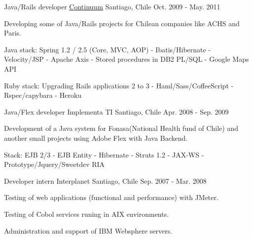 \begin{cventries}
  \cventry
    {Java/Rails developer} %
    {\href{http://www.continuumhq.co/}{\underline{Continuum}}} %
    {Santiago, Chile} %
    {Oct. 2009 - May. 2011} %
    {
      \begin{cvitems} %
        \item { Developing some of Java/Rails projects for Chilean companies like ACHS and Paris.}
        \item { Java stack: Spring 1.2 / 2.5 (Core, MVC, AOP) - Ibatis/Hibernate -
                Velocity/JSP - Apache Axis - Stored procedures in DB2 PL/SQL - Google Maps API}
        \item { Ruby stack: Upgrading Rails applications 2 to 3 - Haml/Sass/CoffeeScript - Rspec/capybara - Heroku }
      \end{cvitems}
    }
\newpage
  \cventry
    {Java/Flex developer} %
    {Implementa TI} %
    {Santiago, Chile} %
    {Apr. 2008 - Sep. 2009} %
    {
      \begin{cvitems} %
        \item { Development of a Java system for Fonasa(National Health fund of Chile)
                and another small projects using Adobe Flex with Java Backend.}
        \item { Stack: EJB 2/3 - EJB Entity - Hibernate - Struts 1.2 - JAX-WS - Prototype/Jquery/Sweetdev RIA}
      \end{cvitems}
    }

  \cventry
    {Developer intern} %
    {Interplanet} %
    {Santiago, Chile} %
    {Sep. 2007 - Mar. 2008} %
    {
      \begin{cvitems} %
        \item { Testing of web applications (functional and performance) with JMeter.}
        \item { Testing of Cobol services runing in AIX environments.}
        \item { Administration and support of IBM Websphere servers.}
      \end{cvitems}
    }

\end{cventries}
